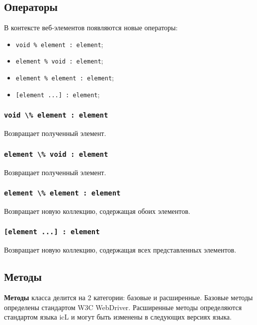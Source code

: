 \documentclass[a4paper, 14pt]{extarticle}
\newenvironment{icItems}
	{ \begin{itemize} [noitemsep,nolistsep] }
	{ \end{itemize} }
\begin{document}
\subsection{Операторы}

В контексте веб-элементов появляются новые операторы:
\begin{icItems}
	\item \lstinline|void % element : element|;
	\item \lstinline|element % void : element|;
	\item \lstinline|element % element : element|;
	\item \lstinline|[element ...] : element|;
\end{icItems}

\subsubsection{\lstinline|void \% element : element|}

Возвращает полученный элемент.

\subsubsection{\lstinline|element \% void : element|}

Возвращает полученный элемент.

\subsubsection{\lstinline|element \% element : element|}

Возвращает новую коллекцию, содержащая обоих элементов.

\subsubsection{\lstinline|[element ...] : element|}

Возвращает новую коллекцию, содержащая всех представленных элементов.

\subsection{Методы}

{\bf Методы} класса  делится на 2 категории: базовые и расширенные. Базовые методы определены стандартом W3C WebDriver. Расширенные методы определяются стандартом языка icL и могут быть изменены в следующих версиях языка.
\end{document}
